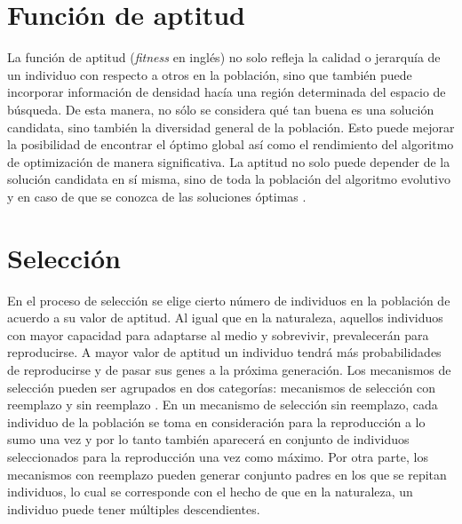 \section{Función de aptitud}
La función de aptitud (\textit{fitness} en inglés) no solo refleja la calidad o jerarquía de un individuo con respecto a otros en la población, sino que también puede incorporar información de densidad hacía una región determinada del espacio de búsqueda. De esta manera, no sólo se considera qué tan buena es una solución candidata, sino también la diversidad general de la población. Esto puede mejorar la posibilidad de encontrar el óptimo global así como el rendimiento del algoritmo de optimización de manera significativa. La aptitud no solo puede depender de la solución candidata en sí misma, sino de toda la población del algoritmo evolutivo y en caso de que se conozca de las soluciones óptimas \cite{weise2009global}.
\section{Selección}\label{Seleccion}
En el proceso  de selección se elige cierto número de individuos en la población de acuerdo a su valor de aptitud. Al igual que en la naturaleza, aquellos individuos con mayor capacidad para adaptarse al medio y sobrevivir, prevalecerán para reproducirse. A mayor valor de aptitud un individuo tendrá más probabilidades de reproducirse y de pasar sus genes a la próxima generación. 
Los mecanismos de selección pueden ser agrupados en dos categorías: mecanismos de selección con reemplazo y sin reemplazo \cite{weise2009global}. En un mecanismo de selección sin reemplazo, cada individuo de la población se toma en consideración para la reproducción a lo sumo una vez y por lo tanto también aparecerá en conjunto de individuos seleccionados para la reproducción una vez como máximo. Por otra parte, los mecanismos con  reemplazo pueden generar conjunto padres en los que se repitan individuos, lo cual se corresponde con el hecho de que en la naturaleza, un individuo puede tener múltiples descendientes.

